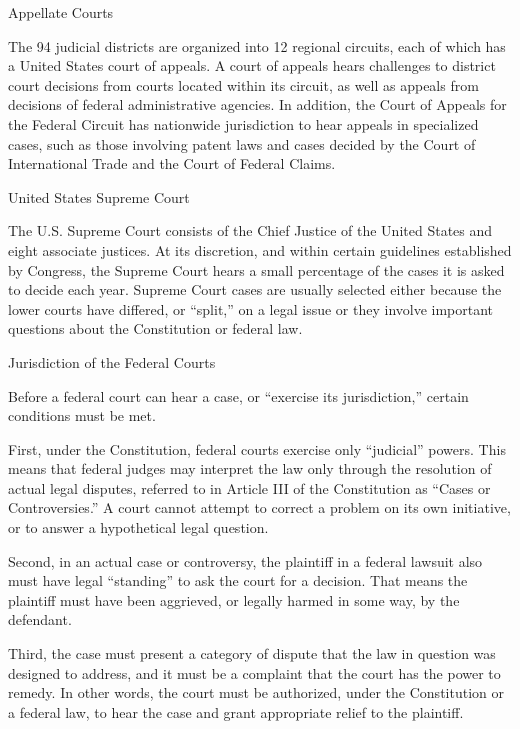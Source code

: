 \documentclass[11pt,letterpaper,twoside]{article}
\begin{document}
{Appellate Courts}

The 94 judicial districts are organized into 12 regional circuits, each
of which has a United States court of appeals. A court of appeals hears
challenges to district court decisions from courts located within its
circuit, as well as appeals from decisions of federal administrative
agencies. In addition, the Court of Appeals for the Federal Circuit has
nationwide jurisdiction to hear appeals in specialized cases, such as
those involving patent laws and cases decided by the Court of
International Trade and the Court of Federal Claims.

{United States Supreme Court}

The U.S. Supreme Court consists of the Chief Justice of the United
States and eight associate justices. At its discretion, and within
certain guidelines established by Congress, the Supreme Court hears a
small percentage of the cases it is asked to decide each year. Supreme
Court cases are usually selected either because the lower courts have
differed, or ``split,'' on a legal issue or they involve important
questions about the Constitution or federal law.

{Jurisdiction of the Federal Courts}

Before a federal court can hear a case, or ``exercise its
jurisdiction,'' certain conditions must be met.

First, under the Constitution, federal courts exercise only ``judicial''
powers. This means that federal judges may interpret the law only
through the resolution of actual legal disputes, referred to in Article
III of the Constitution as ``Cases or Controversies.'' A court cannot
attempt to correct a problem on its own initiative, or to answer a
hypothetical legal question.

Second, in an actual case or controversy, the plaintiff in a federal
lawsuit also must have legal ``standing'' to ask the court for a
decision. That means the plaintiff must have been aggrieved, or legally
harmed in some way, by the defendant.

Third, the case must present a category of dispute that the law in
question was designed to address, and it must be a complaint that the
court has the power to remedy.{}
In other words, the court must be authorized, under the Constitution or
a federal law, to hear the case and grant appropriate relief to the
plaintiff.
\end{document}
